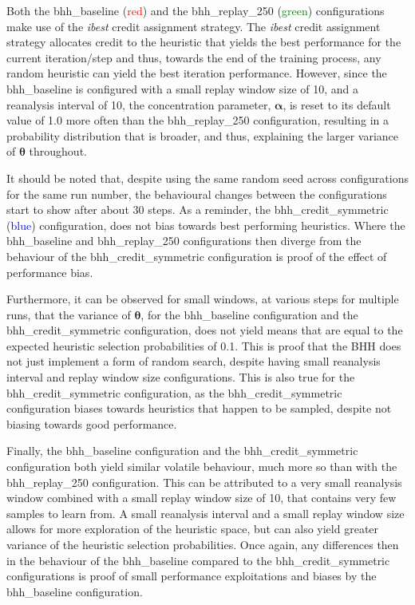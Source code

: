 Both the bhh\_baseline (\textcolor{red}{red}) and the bhh\_replay\_250 (\textcolor{green}{green}) configurations make use of the \textit{ibest} credit assignment strategy. The \textit{ibest} credit assignment strategy allocates credit to the heuristic that yields the best performance for the current iteration/step and thus, towards the end of the training process, any random heuristic can yield the best iteration performance. However, since the bhh\_baseline is configured with a small replay window size of 10, and a reanalysis interval of 10, the concentration parameter, $\boldsymbol{\alpha}$, is reset to its default value of 1.0 more often than the bhh\_replay\_250 configuration, resulting in a probability distribution that is broader, and thus, explaining the larger variance of $\boldsymbol{\theta}$ throughout.

It should be noted that, despite using the same random seed across configurations for the same run number, the behavioural changes between the configurations start to show after about 30 steps. As a reminder, the bhh\_credit\_symmetric (\textcolor{blue}{blue}) configuration, does not bias towards best performing heuristics. Where the bhh\_baseline and bhh\_replay\_250 configurations then diverge from the behaviour of the bhh\_credit\_symmetric configuration is proof of the effect of performance bias.

Furthermore, it can be observed for small windows, at various steps for multiple runs, that the variance of $\boldsymbol{\theta}$, for the bhh\_baseline configuration and the bhh\_credit\_symmetric configuration, does not yield means that are equal to the expected heuristic selection probabilities of 0.1. This is proof that the \acs{BHH} does not just implement a form of random search, despite having small reanalysis interval and replay window size configurations. This is also true for the bhh\_credit\_symmetric configuration, as the bhh\_credit\_symmetric configuration biases towards heuristics that happen to be sampled, despite not biasing towards good performance.

Finally, the bhh\_baseline configuration and the bhh\_credit\_symmetric configuration both yield similar volatile behaviour, much more so than with the bhh\_replay\_250 configuration. This can be attributed to a very small reanalysis window combined with a small replay window size of 10, that contains very few samples to learn from. A small reanalysis interval and a small replay window size allows for more exploration of the heuristic space, but can also yield greater variance of the heuristic selection probabilities. Once again, any differences then in the behaviour of the bhh\_baseline compared to the bhh\_credit\_symmetric configurations is proof of small performance exploitations and biases by the bhh\_baseline configuration.

